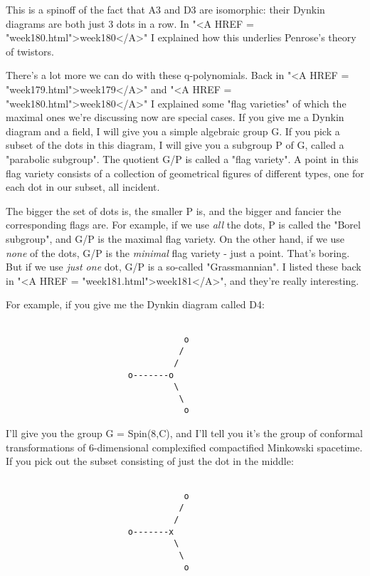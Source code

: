 This is a spinoff of the fact that A3 and D3 are isomorphic: their
Dynkin diagrams are both just 3 dots in a row.  In "<A HREF =
"week180.html">week180</A>" I explained how this underlies
Penrose's theory of twistors.

There's a lot more we can do with these q-polynomials.  Back in "<A
HREF = "week179.html">week179</A>" and "<A HREF =
"week180.html">week180</A>" I explained some "flag
varieties" of which the maximal ones we're discussing now are
special cases.  If you give me a Dynkin diagram and a field, I will give
you a simple algebraic group G.  If you pick a subset of the dots in
this diagram, I will give you a subgroup P of G, called a
"parabolic subgroup".  The quotient G/P is called a "flag
variety".  A point in this flag variety consists of a collection of
geometrical figures of different types, one for each dot in our subset,
all incident.

The bigger the set of dots is, the smaller P is, and the bigger and
fancier the corresponding flags are.  For example, if we use
\emph{all} the dots, P is called the "Borel subgroup", and
G/P is the maximal flag variety.  On the other hand, if we use
\emph{none} of the dots, G/P is the \emph{minimal} flag variety -
just a point.  That's boring.  But if we use \emph{just one} dot, G/P
is a so-called "Grassmannian".  I listed these back in
"<A HREF = "week181.html">week181</A>", and they're really
interesting.

For example, if you give me the Dynkin diagram called D4:
  

\begin{verbatim}

                                   o 
                                  /
                                 /
                        o-------o 
                                 \
                                  \
                                   o
\end{verbatim}
    
I'll give you the group G = Spin(8,C), and I'll tell you it's the group
of conformal transformations of 6-dimensional complexified compactified
Minkowski spacetime.  If you pick out the subset consisting of just the
dot in the middle:
  

\begin{verbatim}

                                   o 
                                  /
                                 /
                        o-------x 
                                 \
                                  \
                                   o
\end{verbatim}
    
